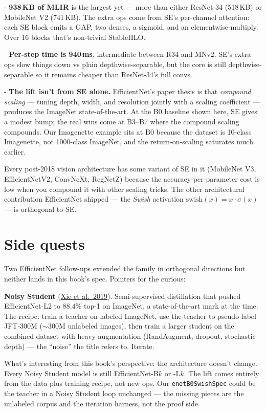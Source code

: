 - \textbf{938\,KB of MLIR} is the largest yet --- more than either
  ResNet-34 (518\,KB) or MobileNet V2 (741\,KB). The extra ops come
  from SE's per-channel attention: each SE block emits a GAP, two
  denses, a sigmoid, and an elementwise-multiply. Over 16 blocks
  that's non-trivial StableHLO.

- \textbf{Per-step time is 940\,ms}, intermediate between R34 and
  MNv2. SE's extra ops slow things down vs plain depthwise-separable,
  but the core is still depthwise-separable so it remains cheaper
  than ResNet-34's full convs.

- \textbf{The lift isn't from SE alone.} EfficientNet's paper thesis
  is that \emph{compound scaling} --- tuning depth, width, and
  resolution jointly with a scaling coefficient --- produces the
  ImageNet state-of-the-art. At the B0 baseline shown here, SE gives
  a modest bump; the real wins come at B3--B7 where the compound
  scaling compounds. Our Imagenette example sits at B0 because the
  dataset is 10-class Imagenette, not 1000-class ImageNet, and the
  return-on-scaling saturates much earlier.

Every post-2018 vision architecture has some variant of SE in it
(MobileNet V3, EfficientNetV2, ConvNeXt, RegNetZ) because the
accuracy-per-parameter cost is low when you compound it with other
scaling tricks. The other architectural contribution
EfficientNet shipped --- the \emph{Swish} activation
$\mathrm{swish}(x) = x \cdot \sigma(x)$ --- is orthogonal to SE.

\section{Side quests}
\label{sec:enet_side_quests}

Two EfficientNet follow-ups extended the family in orthogonal
directions but neither lands in this book's spec. Pointers for the
curious:

\textbf{Noisy Student}
(\href{https://arxiv.org/abs/1911.04252}{Xie et al.\ 2019}).
Semi-supervised distillation that pushed EfficientNet-L2 to
$88.4\%$ top-1 on ImageNet, a state-of-the-art mark at the time. The
recipe: train a teacher on labeled ImageNet, use the teacher to
pseudo-label JFT-300M ($\sim$300M unlabeled images), then train a
larger student on the combined dataset with heavy augmentation
(RandAugment, dropout, stochastic depth) --- the ``noise'' the title
refers to. Iterate.

What's interesting from this book's perspective: the architecture
doesn't change. Every Noisy Student model is still
EfficientNet-B$k$ or -L$k$. The lift comes entirely from the data
plus training recipe, not new ops. Our \texttt{enetB0SwishSpec}
could be the teacher in a Noisy Student loop unchanged --- the
missing pieces are the unlabeled corpus and the iteration harness,
not the proof side.

